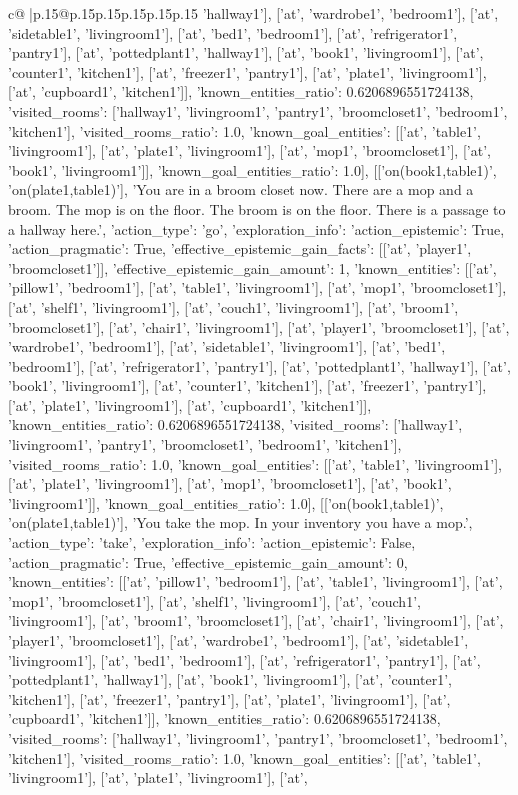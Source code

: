 \documentclass{article}
\begin{document}
{\begin{supertabular}{c@{$\;$}|p{.15\linewidth}@{}p{.15\linewidth}p{.15\linewidth}p{.15\linewidth}p{.15\linewidth}p{.15\linewidth}}
{{{'hallway1'], ['at', 'wardrobe1', 'bedroom1'], ['at', 'sidetable1', 'livingroom1'], ['at', 'bed1', 'bedroom1'], ['at', 'refrigerator1', 'pantry1'], ['at', 'pottedplant1', 'hallway1'], ['at', 'book1', 'livingroom1'], ['at', 'counter1', 'kitchen1'], ['at', 'freezer1', 'pantry1'], ['at', 'plate1', 'livingroom1'], ['at', 'cupboard1', 'kitchen1']], 'known_entities_ratio': 0.6206896551724138, 'visited_rooms': ['hallway1', 'livingroom1', 'pantry1', 'broomcloset1', 'bedroom1', 'kitchen1'], 'visited_rooms_ratio': 1.0, 'known_goal_entities': [['at', 'table1', 'livingroom1'], ['at', 'plate1', 'livingroom1'], ['at', 'mop1', 'broomcloset1'], ['at', 'book1', 'livingroom1']], 'known_goal_entities_ratio': 1.0}}], [['on(book1,table1)', 'on(plate1,table1)'], 'You are in a broom closet now. There are a mop and a broom. The mop is on the floor. The broom is on the floor. There is a passage to a hallway here.', {'action_type': 'go', 'exploration_info': {'action_epistemic': True, 'action_pragmatic': True, 'effective_epistemic_gain_facts': [['at', 'player1', 'broomcloset1']], 'effective_epistemic_gain_amount': 1, 'known_entities': [['at', 'pillow1', 'bedroom1'], ['at', 'table1', 'livingroom1'], ['at', 'mop1', 'broomcloset1'], ['at', 'shelf1', 'livingroom1'], ['at', 'couch1', 'livingroom1'], ['at', 'broom1', 'broomcloset1'], ['at', 'chair1', 'livingroom1'], ['at', 'player1', 'broomcloset1'], ['at', 'wardrobe1', 'bedroom1'], ['at', 'sidetable1', 'livingroom1'], ['at', 'bed1', 'bedroom1'], ['at', 'refrigerator1', 'pantry1'], ['at', 'pottedplant1', 'hallway1'], ['at', 'book1', 'livingroom1'], ['at', 'counter1', 'kitchen1'], ['at', 'freezer1', 'pantry1'], ['at', 'plate1', 'livingroom1'], ['at', 'cupboard1', 'kitchen1']], 'known_entities_ratio': 0.6206896551724138, 'visited_rooms': ['hallway1', 'livingroom1', 'pantry1', 'broomcloset1', 'bedroom1', 'kitchen1'], 'visited_rooms_ratio': 1.0, 'known_goal_entities': [['at', 'table1', 'livingroom1'], ['at', 'plate1', 'livingroom1'], ['at', 'mop1', 'broomcloset1'], ['at', 'book1', 'livingroom1']], 'known_goal_entities_ratio': 1.0}}], [['on(book1,table1)', 'on(plate1,table1)'], 'You take the mop. In your inventory you have a mop.', {'action_type': 'take', 'exploration_info': {'action_epistemic': False, 'action_pragmatic': True, 'effective_epistemic_gain_amount': 0, 'known_entities': [['at', 'pillow1', 'bedroom1'], ['at', 'table1', 'livingroom1'], ['at', 'mop1', 'broomcloset1'], ['at', 'shelf1', 'livingroom1'], ['at', 'couch1', 'livingroom1'], ['at', 'broom1', 'broomcloset1'], ['at', 'chair1', 'livingroom1'], ['at', 'player1', 'broomcloset1'], ['at', 'wardrobe1', 'bedroom1'], ['at', 'sidetable1', 'livingroom1'], ['at', 'bed1', 'bedroom1'], ['at', 'refrigerator1', 'pantry1'], ['at', 'pottedplant1', 'hallway1'], ['at', 'book1', 'livingroom1'], ['at', 'counter1', 'kitchen1'], ['at', 'freezer1', 'pantry1'], ['at', 'plate1', 'livingroom1'], ['at', 'cupboard1', 'kitchen1']], 'known_entities_ratio': 0.6206896551724138, 'visited_rooms': ['hallway1', 'livingroom1', 'pantry1', 'broomcloset1', 'bedroom1', 'kitchen1'], 'visited_rooms_ratio': 1.0, 'known_goal_entities': [['at', 'table1', 'livingroom1'], ['at', 'plate1', 'livingroom1'], ['at', }}}
\end{supertabular}}
\end{document}
